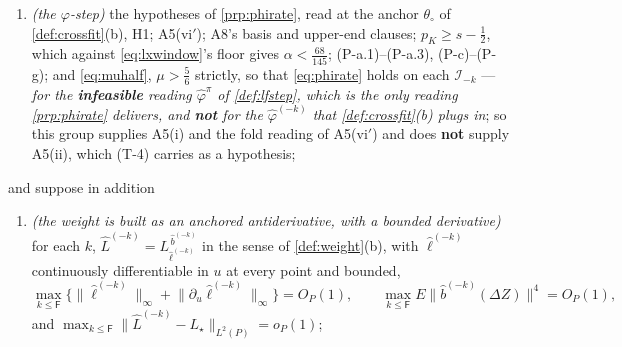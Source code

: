 \begin{theorem}
\begin{enumerate}
{own hypothesis line rather than in a remark};
\item[(T-5)] \emph{(the $\varphi$-step)} the hypotheses of \cref{prp:phirate}, read at the anchor
$\theta_\circ$ of \cref{def:crossfit}(b), H1; A5(vi$'$); A8's basis and upper-end clauses;
$p_K\ge s-\tfrac12$, which against \eqref{eq:lxwindow}'s floor gives $\alpha<\tfrac{68}{145}$; (P-a.1)--(P-a.3), (P-c)--(P-g); and
\eqref{eq:muhalf}, $\mu>\tfrac56$ strictly,
so that \eqref{eq:phirate} holds on each $\mathcal I_{-k}$ --- \emph{for the \textbf{infeasible} reading
$\hat\varphi^{\pi}$ of \cref{def:lfstep}, which is the only reading \cref{prp:phirate} delivers, and
\textbf{not} for the $\hat\varphi^{(-k)}$ that \cref{def:crossfit}\textup{(b)} plugs in}; so this group
supplies A5(i) and the fold reading of A5(vi$'$) and does \textbf{not} supply A5(ii), which
\textup{(T-4)} carries as a hypothesis;
\end{enumerate}
and suppose in addition
\begin{enumerate}
\item[(R-a)] \emph{(the weight is built as an anchored antiderivative, with a bounded derivative)} for each
$k$, $\hat L^{(-k)}=L^{\,\hat b^{(-k)}}_{\hat\ell^{(-k)}}$ in the sense of \cref{def:weight}(b), with
$\hat\ell^{(-k)}$ continuously differentiable in $u$ at every point and bounded,
\[
\max_{k\le\mathsf F}\Big\{\big\|\hat\ell^{(-k)}\big\|_\infty+\big\|\partial_u\hat\ell^{(-k)}\big\|_\infty\Big\}=O_P(1),
\qquad
\max_{k\le\mathsf F}E\big\|\hat b^{(-k)}(\Delta Z)\big\|^{4}=O_P(1),
\]
and $\max_{k\le\mathsf F}\|\hat L^{(-k)}-L_\star\|_{L^{2}(P)}=o_P(1)$;

\end{enumerate}
\end{theorem}

